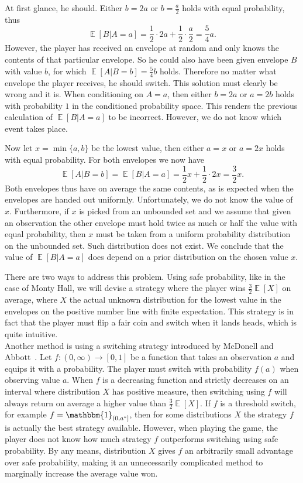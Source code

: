 \documentclass[a4paper]{report}
\theoremstyle{plain}
\theoremstyle{definition}
\theoremstyle{remark}
\numberwithin{equation}{chapter}
\DeclareMathOperator{\E}{\mathbb{E}}
\DeclareMathOperator{\1}{\mathbbm{1}}
\begin{document}
At first glance, he should. Either $b=2a$ or $b=\frac{a}{2}$ holds with equal probability, thus \[\E[B|A=a]=\frac{1}{2}\cdot2a+\frac{1}{2}\cdot\frac{a}{2}=\frac{5}{4}a.\]
However, the player has received an envelope at random and only knows the contents of that particular envelope. So he could also have been given envelope $B$ with value $b$, for which $\E[A|B=b]=\frac{5}{4}b$ holds. Therefore no matter what envelope the player receives, he should switch. This solution must clearly be wrong and it is. When conditioning on $A=a$, then either $b=2a$ or $a=2b$ holds with probability $1$ in the conditioned probability space. This renders the previous calculation of $\E[B|A=a]$ to be incorrect. However, we do not know which event takes place.

Now let $x=\min\{a,b\}$ be the lowest value, then either $a=x$ or $a=2x$ holds with equal probability. For both envelopes we now have
\[
\E[A|B=b]=\E[B|A=a]=\frac{1}{2}x+\frac{1}{2}\cdot2x=\frac{3}{2}x.
\]
Both envelopes thus have on average the same contents, as is expected when the envelopes are handed out uniformly. Unfortunately, we do not know the value of $x$. Furthermore, if $x$ is picked from an unbounded set and we assume that given an observation the other envelope must hold twice as much or half the value with equal probability, then $x$ must be taken from a uniform probability distribution on the unbounded set. Such distribution does not exist. We conclude that the value of $\E[B|A=a]$ does depend on a prior distribution on the chosen value $x$.

There are two ways to address this problem. Using safe probability, like in the case of Monty Hall, we will devise a strategy where the player wins $\frac{3}{2}\E[X]$ on average, where $X$ the actual unknown distribution for the lowest value in the envelopes on the positive number line with finite expectation. This strategy is in fact that the player must flip a fair coin and switch when it lands heads, which is quite intuitive.\\
Another method is using a switching strategy introduced by McDonell and Abbott~\cite{McDonnell09,Abbott10,McDonnell11}. Let $f\colon (0,\infty)\to[0,1]$ be a function that takes an observation $a$ and equips it with a probability. The player must switch with probability $f(a)$ when observing value $a$. When $f$ is a decreasing function and strictly decreases on an interval where distribution $X$ has positive measure, then switching using $f$ will always return on average a higher value than $\frac{3}{2}\E[X]$. If $f$ is a threshold switch, for example $f=\1_{(0,a^*]}$, then for some distributions $X$ the strategy $f$ is actually the best strategy available. However, when playing the game, the player does not know how much strategy $f$ outperforms switching using safe probability. By any means, distribution $X$ gives $f$ an arbitrarily small advantage over safe probability, making it an unnecessarily complicated method to marginally increase the average value won.
\end{document}
